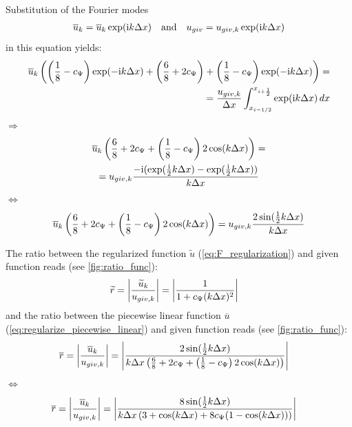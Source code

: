 Substitution of the Fourier modes
\begin{align}
\overline u_k =  \overline u_k \exp({\rm i} k \Delta x)\quad \text{and} \quad  u_{giv} = u_{giv,k} \exp({\rm i} k \Delta x)
\end{align}
in this equation yields:
\begin{align}
\overline u_k  \left(  \left( \frac{1}{8} -  c_{\Psi}\right) \exp(-{\rm i} k \Delta x) +
\left(\frac{6}{8} + 2c_{\Psi} \right) +
\left( \frac{1}{8} -  c_{\Psi} \right) \exp(-{\rm i} k \Delta x) \right)  = &
\\
= \frac{u_{giv,k}}{\Delta x} \int_{x_{i-1/2}}^{x_{i+\frac{1}{2}}}  \exp({\rm i} k \Delta x)\, dx &
\end{align}
$\Rightarrow$
\begin{multline}
\overline u_k \left(  \frac{6}{8} + 2c_{\Psi} + \left( \frac{1}{8} -  c_{\Psi} \right)  2 \cos(k\Delta x) \right)
=
\\
= u_{giv,k} \frac{-{\rm i} (\exp(\frac{{\rm i}}{2} k \Delta x) - \exp(\frac{{\rm i}}{2} k \Delta x) )}{k\Delta x}
\end{multline}
$\Leftrightarrow$
\begin{multline}
\overline u_k \left(  \frac{6}{8} + 2c_{\Psi} + \left( \frac{1}{8} -  c_{\Psi} \right)  2 \cos(k\Delta x) \right)
= u_{giv,k} \frac{2 \sin(\frac{1}{2} k \Delta x)}{k\Delta x}
\label{eq:regularize_piecewise_linear}
\end{multline}

The ratio between the regularized function $\widetilde{u}$ (\autoref{eq:F_regularization}) and given function reads (see \autoref{fig:ratio_func}):
\begin{align}
\widetilde{r} = \left|   \frac{\widetilde u_k}{ u_{giv,k}}  \right| & = \left|  \frac{1}{1 + c_{\Psi} (k \Delta x)^2}  \right| \label{eq:r_tilde}
\end{align}
and the ratio between the piecewise linear function $\overline{u}$ (\autoref{eq:regularize_piecewise_linear}) and given function reads (see \autoref{fig:ratio_func}):
\begin{align}
\overline{r} = \left|   \frac{\overline u_k}{ u_{giv,k}}  \right| & = \left|  \frac{2 \sin(\frac{1}{2} k \Delta x)}{k\Delta x\left( \frac{6}{8} + 2c_{\Psi} + \left( \frac{1}{8} -  c_{\Psi} \right)  2 \cos(k\Delta x) \right)}  \right|
\end{align}
$\Leftrightarrow$
\begin{align}
\overline{r} = \left|   \frac{\overline u_k}{ u_{giv,k}}  \right| & = \left|  \frac{8 \sin(\frac{1}{2} k \Delta x)}{k\Delta x\left( 3 + \cos(k\Delta x) + 8c_{\Psi} ( 1 - \cos(k\Delta x))\right) }  \right|
\end{align}

